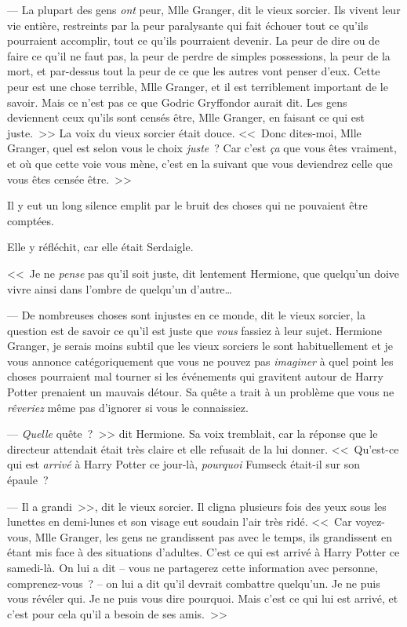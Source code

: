 --- La plupart des gens \emph{ont} peur, Mlle Granger, dit le vieux sorcier. Ils vivent leur vie entière, restreints par la peur paralysante qui fait échouer tout ce qu'ils pourraient accomplir, tout ce qu'ils pourraient devenir. La peur de dire ou de faire ce qu'il ne faut pas, la peur de perdre de simples possessions, la peur de la mort, et par-dessus tout la peur de ce que les autres vont penser d'eux. Cette peur est une chose terrible, Mlle Granger, et il est terriblement important de le savoir. Mais ce n'est pas ce que Godric Gryffondor aurait dit. Les gens deviennent ceux qu'ils sont censés être, Mlle Granger, en faisant ce qui est juste.~>> La voix du vieux sorcier était douce. <<~Donc dites-moi, Mlle Granger, quel est selon vous le choix \emph{juste}~? Car c'est \emph{ça} que vous êtes vraiment, et où que cette voie vous mène, c'est en la suivant que vous deviendrez celle que vous êtes censée être.~>>

Il y eut un long silence emplit par le bruit des choses qui ne pouvaient être comptées.

Elle y réfléchit, car elle était Serdaigle.

<<~Je ne \emph{pense} pas qu'il soit juste, dit lentement Hermione, que quelqu'un doive vivre ainsi dans l'ombre de quelqu'un d'autre…

--- De nombreuses choses sont injustes en ce monde, dit le vieux sorcier, la question est de savoir ce qu'il est juste que \emph{vous} fassiez à leur sujet. Hermione Granger, je serais moins subtil que les vieux sorciers le sont habituellement et je vous annonce catégoriquement que vous ne pouvez pas \emph{imaginer} à quel point les choses pourraient mal tourner si les événements qui gravitent autour de Harry Potter prenaient un mauvais détour. Sa quête a trait à un problème que vous ne \emph{rêveriez} même pas d'ignorer si vous le connaissiez.

--- \emph{Quelle} quête~?~>> dit Hermione. Sa voix tremblait, car la réponse que le directeur attendait était très claire et elle refusait de la lui donner. <<~Qu'est-ce qui est \emph{arrivé} à Harry Potter ce jour-là, \emph{pourquoi} Fumseck était-il sur son épaule~?

--- Il a grandi~>>, dit le vieux sorcier. Il cligna plusieurs fois des yeux sous les lunettes en demi-lunes et son visage eut soudain l'air très ridé. <<~Car voyez-vous, Mlle Granger, les gens ne grandissent pas avec le temps, ils grandissent en étant mis face à des situations d'adultes. C'est ce qui est arrivé à Harry Potter ce samedi-là. On lui a dit -- vous ne partagerez cette information avec personne, comprenez-vous~? -- on lui a dit qu'il devrait combattre quelqu'un. Je ne puis vous révéler qui. Je ne puis vous dire pourquoi. Mais c'est ce qui lui est arrivé, et c'est pour cela qu'il a besoin de ses amis.~>>

